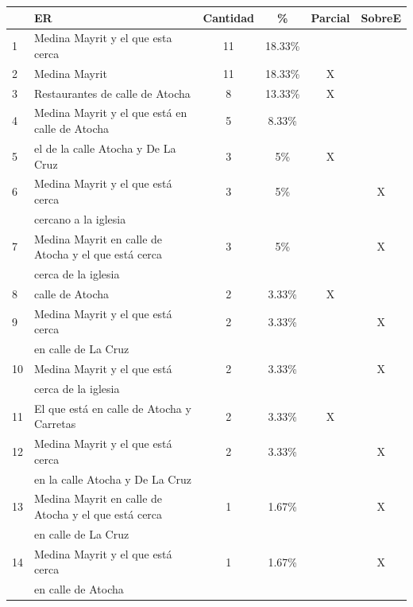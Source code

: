 \begin{table}[H]
{\footnotesize
\begin{center}
\begin{tabular}{|l|l|c|c|c|c|}
\hline
&ER 					      & Cantidad &  \% & Parcial & SobreE\\ \hline \hline
1&Medina Mayrit y el que esta cerca        &	11	&	18.33\% &  &  \\ \hline


2&Medina Mayrit			&11		&	18.33\%	&X&\\  \hline


3&Restaurantes de calle de Atocha				&	8  &	13.33\%	&X&\\ \hline

4&Medina Mayrit y el que est\'a en calle de Atocha	      &5		&	8.33\%	&&\\ \hline

5&el de la calle Atocha y De La Cruz       &	3  &	5\%	&X & \\  \hline
6&Medina Mayrit y el que est\'a cerca				&		3 &	5\%  & &X\\
&cercano a la iglesia				&	  &	&&\\ \hline
7&Medina Mayrit en calle de Atocha y el que est\'a cerca				& 3  &	5\%	&&X\\
&cerca de la iglesia				&	  &		&&\\ \hline

8&calle de Atocha				&	2  &	3.33\%	&X&\\ \hline

9&Medina Mayrit y el que est\'a cerca			&2  &	3.33\%	&&X\\
&en calle de La Cruz	&	  &		&&\\ \hline

10&Medina Mayrit y el que est\'a 	&	2	&	3.33\%  &&X\\
&cerca de la iglesia				&	  &	&&\\ \hline
11&El que est\'a en calle de Atocha y Carretas 					&	2  &	3.33\%	&X&\\ \hline
12&Medina Mayrit y el que est\'a cerca				&	2	&	3.33\%  &&X\\
&en la calle Atocha y De La Cruz        &	  &	&&\\ \hline
13&Medina Mayrit en calle de Atocha y el que est\'a cerca			&1  &	1.67\%	&&X\\
&en calle de La Cruz	&	  &		&&\\ \hline

14&Medina Mayrit y el que est\'a cerca			&1  &	1.67\%	&&X\\
&en calle de Atocha	&	 &		&&\\ \hline


\end{tabular}
\end{center}}
\end{table}
